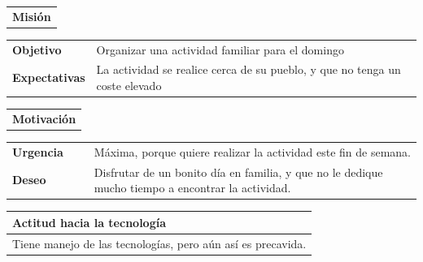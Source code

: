 \documentclass[11pt]{article}
\begin{document}
\begin{table}[H]
  \begin{tabular}{l}
    \textbf{Misión} 
  \end{tabular}
  
  \begin{tabular}{p{0.2\linewidth}|p{0.8\linewidth}}
    \toprule
    \textbf{Objetivo} & Organizar una actividad familiar para el domingo\\
    \textbf{Expectativas}  & La actividad se realice cerca de su pueblo, y que no tenga un coste elevado \\
    \bottomrule
  \end{tabular}

  \begin{tabular}{l}
    \textbf{Motivación} 
  \end{tabular}

  \begin{tabular}{p{0.2\linewidth}|p{0.8\linewidth}}
    \toprule
    \textbf{Urgencia} & Máxima, porque quiere realizar la actividad este fin de semana.\\
    \textbf{Deseo}  & Disfrutar de un bonito día en familia, y que no le dedique mucho tiempo a encontrar la actividad.\\
    \bottomrule
  \end{tabular}

  \begin{tabular}{p{1.028\linewidth}}
    \textbf{Actitud hacia la tecnología}\\
    \midrule
    Tiene manejo de las tecnologías, pero aún así es precavida.  
  \end{tabular}
\end{table}
\end{document}
